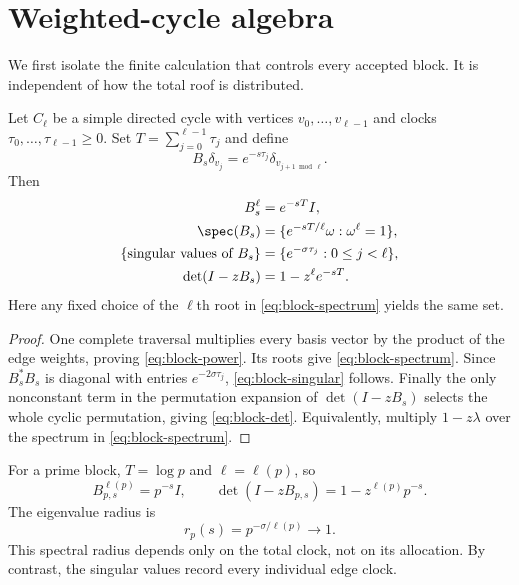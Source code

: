 \section{Weighted-cycle algebra}
\label{sec:cycle-algebra}

We first isolate the finite calculation that controls every accepted block.
It is independent of how the total roof is distributed.

\begin{lemma}
\label{lem:cycle-block}
Let $C_\ell$ be a simple directed cycle with vertices
$v_0,\ldots,v_{\ell-1}$ and clocks $\tau_0,\ldots,\tau_{\ell-1}\ge0$.
Set $T=\sum_{j=0}^{\ell-1}\tau_j$ and define
\[
B_s\delta_{v_j}=e^{-s\tau_j}\delta_{v_{j+1\bmod\ell}}.
\]
Then
\begin{align}
B_s^\ell&=e^{-sT}I,                                      \label{eq:block-power}\\
\spec(B_s)&=\{e^{-sT/\ell}\omega:\omega^\ell=1\},       \label{eq:block-spectrum}\\
\{\text{singular values of }B_s\}
 &=\{e^{-\sigma\tau_j}:0\le j<\ell\},                   \label{eq:block-singular}\\
\det(I-zB_s)&=1-z^\ell e^{-sT}.                           \label{eq:block-det}
\end{align}
Here any fixed choice of the $\ell$th root in
\eqref{eq:block-spectrum} yields the same set.
\end{lemma}

\begin{proof}
One complete traversal multiplies every basis vector by the product of the
edge weights, proving \eqref{eq:block-power}.  Its roots give
\eqref{eq:block-spectrum}.  Since $B_s^*B_s$ is diagonal with entries
$e^{-2\sigma\tau_j}$, \eqref{eq:block-singular} follows.  Finally the only
nonconstant term in the permutation expansion of $\det(I-zB_s)$ selects the
whole cyclic permutation, giving \eqref{eq:block-det}.  Equivalently, multiply
$1-z\lambda$ over the spectrum in \eqref{eq:block-spectrum}.
\end{proof}

For a prime block, $T=\log p$ and $\ell=\ell(p)$, so
\begin{equation}
B_{p,s}^{\ell(p)}=p^{-s}I,
\qquad
\det(I-zB_{p,s})=1-z^{\ell(p)}p^{-s}.
\label{eq:prime-block}
\end{equation}
The eigenvalue radius is
\begin{equation}
r_p(s)=p^{-\sigma/\ell(p)}\longrightarrow1.
\label{eq:block-radius}
\end{equation}
This spectral radius depends only on the total clock, not on its allocation.
By contrast, the singular values record every individual edge clock.

